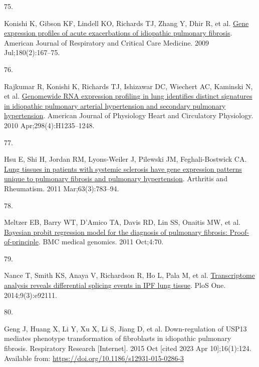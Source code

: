 \documentclass[
]{article}
\newlength{\cslhangindent}
\newlength{\csllabelwidth}
\newlength{\cslentryspacingunit} %
\newenvironment{CSLReferences}[2] %
 {%
  \setlength{\parindent}{0pt}
  \ifodd #1
  \let\oldpar\par
  \def\par{\hangindent=\cslhangindent\oldpar}
  \fi
  \setlength{\parskip}{#2\cslentryspacingunit}
 }%
 {}
\newcommand{\CSLLeftMargin}[1]{\parbox[t]{\csllabelwidth}{#1}}
\newcommand{\CSLRightInline}[1]{\parbox[t]{\linewidth - \csllabelwidth}{#1}\break}
\begin{document}
\begin{CSLReferences}{0}{0}
\leavevmode{}%
\CSLLeftMargin{75. }%
\CSLRightInline{Konishi K, Gibson KF, Lindell KO, Richards TJ, Zhang Y, Dhir R, et al. \href{https://doi.org/10.1164/rccm.200810-1596OC}{Gene expression profiles of acute exacerbations of idiopathic pulmonary fibrosis}. American Journal of Respiratory and Critical Care Medicine. 2009 Jul;180(2):167--75. }

\leavevmode{}%
\CSLLeftMargin{76. }%
\CSLRightInline{Rajkumar R, Konishi K, Richards TJ, Ishizawar DC, Wiechert AC, Kaminski N, et al. \href{https://doi.org/10.1152/ajpheart.00254.2009}{Genomewide {RNA} expression profiling in lung identifies distinct signatures in idiopathic pulmonary arterial hypertension and secondary pulmonary hypertension}. American Journal of Physiology Heart and Circulatory Physiology. 2010 Apr;298(4):H1235--1248. }

\leavevmode{}%
\CSLLeftMargin{77. }%
\CSLRightInline{Hsu E, Shi H, Jordan RM, Lyons-Weiler J, Pilewski JM, Feghali-Bostwick CA. \href{https://doi.org/10.1002/art.30159}{Lung tissues in patients with systemic sclerosis have gene expression patterns unique to pulmonary fibrosis and pulmonary hypertension}. Arthritis and Rheumatism. 2011 Mar;63(3):783--94. }

\leavevmode{}%
\CSLLeftMargin{78. }%
\CSLRightInline{Meltzer EB, Barry WT, D'Amico TA, Davis RD, Lin SS, Onaitis MW, et al. \href{https://doi.org/10.1186/1755-8794-4-70}{Bayesian probit regression model for the diagnosis of pulmonary fibrosis: Proof-of-principle}. BMC medical genomics. 2011 Oct;4:70. }

\leavevmode{}%
\CSLLeftMargin{79. }%
\CSLRightInline{Nance T, Smith KS, Anaya V, Richardson R, Ho L, Pala M, et al. \href{https://doi.org/10.1371/journal.pone.0092111}{Transcriptome analysis reveals differential splicing events in {IPF} lung tissue}. PloS One. 2014;9(3):e92111. }

\leavevmode{}%
\CSLLeftMargin{80. }%
\CSLRightInline{Geng J, Huang X, Li Y, Xu X, Li S, Jiang D, et al. Down-regulation of {USP13} mediates phenotype transformation of fibroblasts in idiopathic pulmonary fibrosis. Respiratory Research {[}Internet{]}. 2015 Oct {[}cited 2023 Apr 10{]};16(1):124. Available from: \url{https://doi.org/10.1186/s12931-015-0286-3}}


\end{CSLReferences}
\end{document}
